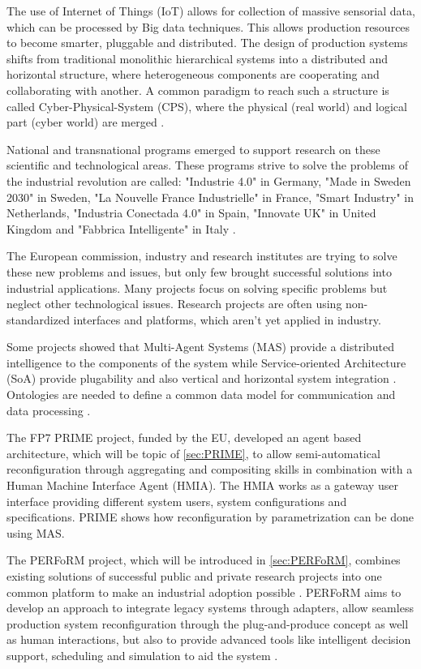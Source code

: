 \documentclass[conference,compsoc,hidelinks]{IEEEtran}
\begin{document}
The use of Internet of Things (IoT) allows for collection of massive sensorial data, which can be processed by Big data techniques. This allows production resources to become smarter, pluggable and distributed. The design of production systems shifts from traditional monolithic hierarchical systems into a distributed and horizontal structure, where heterogeneous components are cooperating and collaborating with another. A common paradigm to reach such a structure is called Cyber-Physical-System (CPS), where the physical (real world) and logical part (cyber world) are merged \cite{SpecPERFoRM}.

National and transnational programs emerged to support research on these scientific and technological areas. These programs strive to solve the problems of the industrial revolution are called: "Industrie 4.0" in Germany, "Made in Sweden 2030" in Sweden, "La Nouvelle France Industrielle" in France, "Smart Industry" in Netherlands, "Industria Conectada 4.0" in Spain, "Innovate UK" in United Kingdom and "Fabbrica Intelligente" in Italy \cite{SpecPERFoRM}. 

The European commission, industry and research institutes are trying to solve these new problems and issues, but only few brought successful solutions into industrial applications. Many projects focus on solving specific problems but neglect other technological issues. Research projects are often using non-standardized interfaces and platforms, which aren't yet applied in industry. 

Some projects showed that Multi-Agent Systems (MAS) provide a distributed intelligence to the components of the system while Service-oriented Architecture (SoA) provide plugability and also vertical and horizontal system integration \cite{Colombo2009}. Ontologies are needed to define a common data model for communication and data processing \cite{Peres2017}.

The FP7 PRIME project, funded by the EU, developed an agent based architecture, which will be topic of \autoref{sec:PRIME}, to allow semi-automatical reconfiguration through aggregating and compositing skills in combination with a Human Machine Interface Agent (HMIA). The HMIA works as a gateway user interface providing different system users, system configurations and specifications. PRIME shows how reconfiguration by parametrization can be done using MAS.

The PERFoRM project, which will be introduced in \autoref{sec:PERFoRM}, combines existing solutions of successful public and private research projects into one common platform to make an industrial adoption possible \cite{HarmonizedSystems}. PERFoRM aims to develop an approach to integrate legacy systems through adapters, allow seamless production system reconfiguration through the plug-and-produce concept as well as human interactions, but also to provide advanced tools like intelligent decision support, scheduling and simulation to aid the system \cite{SpecPERFoRM}.
\end{document}
